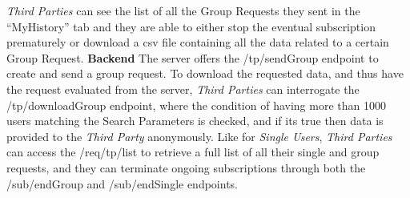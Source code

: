 \documentclass[titlepage]{article}
\begin{document}
	{\it Third Parties} can see the list of all the Group Requests they sent in the “MyHistory” tab and they are able to either stop the eventual subscription prematurely or download a csv file containing all the data related to a certain Group Request. 
	\newline
	\newline
	\noindent
	{\bf Backend} \newline
	The server offers the /tp/sendGroup endpoint to create and send a group request. To download the requested data, and thus have the request evaluated from the server, {\it Third Parties} can interrogate the /tp/downloadGroup endpoint, where the condition of having more than 1000 users matching the Search Parameters is checked, and if it\textsc{}s true then data is provided to the {\it Third Party} anonymously.
	Like for {\it Single Users}, {\it Third Parties} can access the /req/tp/list to retrieve a full list of all their single and group requests, and they can terminate ongoing subscriptions through both the /sub/endGroup and /sub/endSingle endpoints.
	
	
\end{document}
